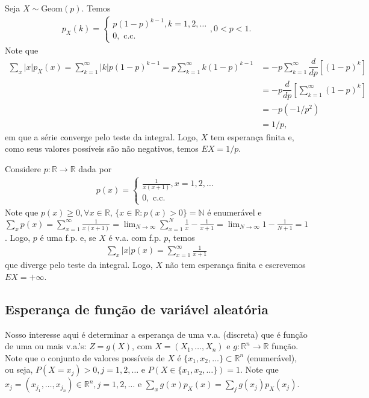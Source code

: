 \documentclass[../Notas.tex]{subfiles}
\begin{document}
\begin{example}
Seja $X\sim\text{Geom}(p)$. Temos
\begin{align*}
    p_X(k) = \begin{cases}
    p(1-p)^{k-1}, k = 1,2,\dots \\
    0, \text{ c.c.}
    \end{cases}, 0 < p < 1.
\end{align*}
Note que
\begin{align*}
    \sum_x |x|p_X(x) = \sum_{k=1}^{\infty} |k|p(1-p)^{k-1} = p\sum_{k=1}^{\infty} k(1-p)^{k-1} &= -p\sum_{k=1}^{\infty} \dfrac{d}{dp}[(1-p)^k] \\
    &= -p\dfrac{d}{dp}\left[ \sum_{k=1}^{\infty} (1-p)^k \right] \\
    &= -p(-1/p^2) \\
    &= 1/p,
\end{align*}
em que a série converge pelo teste da integral. Logo, $X$ tem esperança finita e, como seus valores possíveis são não negativos, temos $EX=1/p$.
\end{example}

\begin{example}
Considere $p:\mathbb{R}\to\mathbb{R}$ dada por
\begin{align*}
    p(x) = \begin{cases}
    \frac{1}{x(x+1)}, x = 1,2,\dots \\
    0, \text{ c.c.}
    \end{cases}
\end{align*}
Note que $p(x)\geq 0, \forall x\in\mathbb{R}$, $\{x\in\mathbb{R} : p(x) > 0\} = \mathbb{N}$ é enumerável e $\displaystyle{ \sum_x p(x) = \sum_{x=1}^{\infty}\frac{1}{x(x+1)} = \lim_{N\to\infty}\sum_{x=1}^N \frac{1}{x} - \frac{1}{x+1} = \lim_{N\to\infty} 1 - \frac{1}{N+1} = 1 }$. Logo, $p$ é uma f.p. e, se $X$ é v.a. com f.p. $p$, temos
\begin{align*}
    \sum_x |x|p(x) = \sum_{x=1}^{\infty}\frac{1}{x+1}
\end{align*}
que diverge pelo teste da integral. Logo, $X$ não tem esperança finita e escrevemos $EX = +\infty$.
\end{example}

\subsection{Esperança de função de variável aleatória}
Nosso interesse aqui é determinar a esperança de uma v.a. (discreta) que é função de uma ou mais v.a.'s: $Z = g(X)$, com $X = (X_1, \dots, X_n)$ e $g:\mathbb{R}^n\to\mathbb{R}$ função. Note que o conjunto de valores possíveis de $X$ é $\{x_1, x_2, \dots \}\subset\mathbb{R}^n$ (enumerável), ou seja, $P(X=x_j) > 0, j = 1,2,\dots$ e $P(X\in\{x_1, x_2, \dots\}) = 1$. Note que $x_j = (x_{j_1}, \dots, x_{j_n})\in\mathbb{R}^n, j=1,2,\dots$ e $\displaystyle{ \sum_x g(x)p_X(x) = \sum_j g(x_j)p_X(x_j) }$.
\end{document}
